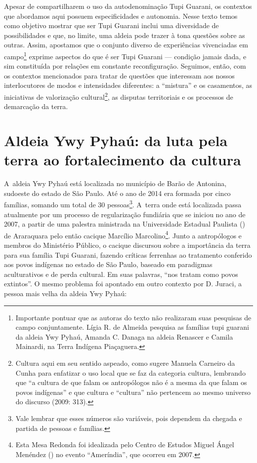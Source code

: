 Apesar de compartilharem o uso da autodenominação Tupi Guarani, os
contextos que abordamos aqui possuem especificidades e autonomia. Nesse
texto temos como objetivo mostrar que ser Tupi Guarani inclui uma
diversidade de possibilidades e que, no limite, uma aldeia pode trazer
à tona questões sobre as outras. Assim, apostamos que o conjunto
diverso de experiências vivenciadas em campo\footnote{Importante
pontuar que as autoras do texto não realizaram suas pesquisas de campo
conjuntamente. Lígia R. de Almeida pesquisa as famílias tupi
guarani da aldeia Ywy Pyhaú, Amanda C. Danaga na aldeia Renascer e
Camila Mainardi, na Terra Indígena Piaçaguera.} exprime aspectos do
que é ser Tupi Guarani --- condição jamais dada, e sim constituída por
relações em constante reconfiguração. Seguimos, então, com os contextos
mencionados para tratar de questões que interessam aos nossos
interlocutores de modos e intensidades diferentes: a ``mistura'' e os
casamentos, as iniciativas de valorização cultural\footnote{Cultura
aqui em seu sentido aspeado, como sugere Manuela Carneiro da Cunha para
enfatizar o uso local que se faz da categoria cultura, lembrando que ``a
cultura de que falam os antropólogos não é a mesma da que falam os
povos indígenas'' e que cultura e ``cultura'' não pertencem ao mesmo
universo do discurso (2009: 313).}, as disputas territoriais e os
processos de demarcação da terra. 

\section{Aldeia Ywy Pyhaú: da luta pela terra ao fortalecimento da cultura}

A~aldeia Ywy Pyhaú está localizada no município de Barão de Antonina,
sudoeste do estado de São Paulo. Até o ano de 2014 era formada por
cinco famílias, somando um total de 30 pessoas\footnote{Vale lembrar
que esses números são variáveis, pois dependem da chegada e partida de
pessoas e famílias.}. A~terra onde está localizada passa atualmente por
um processo de regularização fundiária que se iniciou no ano de 2007, a
partir de uma palestra ministrada na Universidade Estadual Paulista
() de Araraquara pelo então cacique Marcílio
Marcolino\footnote{Esta Mesa Redonda foi idealizada pelo Centro de
Estudos Miguel Ángel Menéndez () no evento ``Ameríndia'', que ocorreu
em 2007.}. Junto a antropólogos e membros do Ministério Público, o
cacique discursou sobre a importância da terra para sua família Tupi
Guarani, fazendo críticas ferrenhas ao tratamento conferido aos povos
indígenas no estado de São Paulo, baseado em paradigmas aculturativos e
de perda cultural. Em suas palavras, ``nos tratam como povos extintos''. O
mesmo problema foi apontado em outro contexto por D. Juraci, a pessoa
mais velha da aldeia Ywy Pyhaú:

